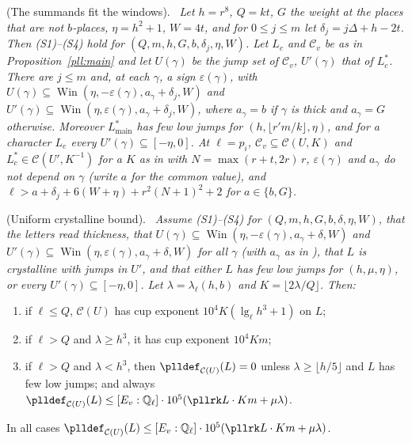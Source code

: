 \documentclass[10pt]{amsart}
\theoremstyle{definition}
\theoremstyle{remark}
\newcommand{\Q}{\mathbb Q}
\providecommand{\pkiC}{\mathcal C}
\providecommand{\pkiWin}{\operatorname{Win}}
\providecommand{\pkilog}{\operatorname{lg}}
\newenvironment{quotedthm}[2]{\par\medskip\noindent\begingroup
  \textbf{#1}#2.\ \itshape\ignorespaces}{\endgroup\par\medskip}
\begin{document}
\begin{quotedthm}{\cite[Proposition~2.10]{P56}}{ (The summands fit the windows)}
Let $h=r^8$, $Q=kt$, $G$ the weight at the places that are not $b$-places, $\eta=h^2+1$, $W=4t$, and
for $0\le j\le m$ let $\delta_j=j\Delta+h-2t$. Then (S1)--(S4) hold for $(Q,m,h,G,b,\delta_j,\eta,W)$.
Let $L_c$ and $\mathcal C_v$ be as in Proposition~\ref{pll:main} and let $U(\gamma)$ be the jump set
of $\mathcal C_v$, $U'(\gamma)$ that of $L_c^*$. There are $j\le m$ and, at each $\gamma$, a sign
$\varepsilon(\gamma)$, with $U(\gamma)\subseteq\pkiWin(\eta,-\varepsilon(\gamma),a_\gamma+\delta_j,W)$
and $U'(\gamma)\subseteq\pkiWin(\eta,\varepsilon(\gamma),a_\gamma+\delta_j,W)$, where $a_\gamma=b$ if
$\gamma$ is thick and $a_\gamma=G$ otherwise. Moreover $L_{\mathrm{main}}^*$ has few low jumps for
$(h,\lfloor r'm/k\rfloor,\eta)$, and for a character $L_e$ every $U'(\gamma)\subseteq[-\eta,0]$.
At $\ell=p_i$, $\mathcal C_v\subseteq\pkiC(U,K)$ and $L_c^*\in\pkiC(U',K^{-1})$ for a $K$ as in
{\cite[Proposition~2.8]{P56}} with $N=\max(r+t,2r)\,r$, $\varepsilon(\gamma)$ and $a_\gamma$ do not depend on $\gamma$ (write $a$ for the common value), and
$\ell>a+\delta_j+6(W+\eta)+r^2(N+1)^2+2$ for $a\in\{b,G\}$.
\end{quotedthm}

\begin{quotedthm}{\cite[Theorem~2.13]{P56}}{ (Uniform crystalline bound)}
Assume (S1)--(S4) for $(Q,m,h,G,b,\delta,\eta,W)$, that the letters read thickness, that
$U(\gamma)\subseteq\pkiWin(\eta,-\varepsilon(\gamma),a_\gamma+\delta,W)$ and
$U'(\gamma)\subseteq\pkiWin(\eta,\varepsilon(\gamma),a_\gamma+\delta,W)$ for all $\gamma$ (with
$a_\gamma$ as in {\cite[Lemma~2.12]{P56}}), that $L$ is crystalline with jumps in $U'$, and that
either $L$ has few low jumps for $(h,\mu,\eta)$, or every $U'(\gamma)\subseteq[-\eta,0]$. Let
$\lambda=\lambda_\ell(h,b)$ and $K=\lfloor2\lambda/Q\rfloor$. Then:
\begin{enumerate}
\item[(b)] if $\ell\le Q$, $\pkiC(U)$ has cup exponent $10^4K(\pkilog_\ell h^3+1)$ on $L$;
\item[(c)] if $\ell>Q$ and $\lambda\ge h^3$, it has cup exponent $10^4Km$;
\item[(d)] if $\ell>Q$ and $\lambda<h^3$, then $\plldef_{\pkiC(U)}(L)=0$ unless $\lambda\ge\lfloor
h/5\rfloor$ and $L$ has few low jumps; and always
$\plldef_{\pkiC(U)}(L)\le[E_v:\Q_\ell]\cdot10^5(\pllrk L\cdot Km+\mu\lambda)$.
\end{enumerate}
In all cases $\plldef_{\pkiC(U)}(L)\le[E_v:\Q_\ell]\cdot10^5(\pllrk L\cdot Km+\mu\lambda)$.
\end{quotedthm}
\end{document}
